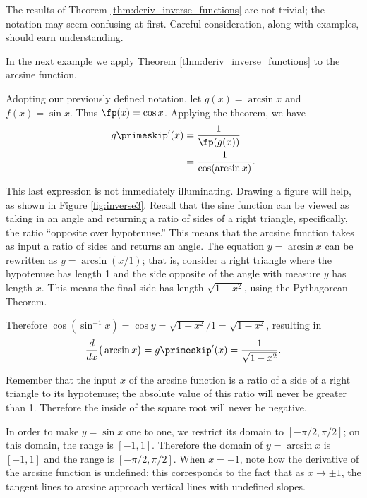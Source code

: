 The results of Theorem \ref{thm:deriv_inverse_functions} are not trivial; the notation may seem confusing at first. Careful consideration, along with examples, should earn understanding.

In the next example we apply Theorem \ref{thm:deriv_inverse_functions} to the arcsine function.\\

{Adopting our previously defined notation, let $g(x) = \arcsin x$ and $f(x) = \sin x$. Thus $\fp(x) = \cos x$. Applying the theorem, we have 
			\begin{align*}
			g\primeskip'(x) &= \frac{1}{\fp(g(x))} \\
						&= \frac{1}{\cos(\arcsin x)}.
			\end{align*}
			
This last expression is not immediately illuminating. Drawing a figure will help, as shown in Figure \ref{fig:inverse3}. Recall that the sine function can be viewed as taking in an angle and returning a ratio of sides of a right triangle, specifically, the ratio ``opposite over hypotenuse.'' This means that the arcsine function takes as input a ratio of sides and returns an angle. The equation $y=\arcsin x$ can be rewritten as $y=\arcsin (x/1)$; that is, consider a right triangle where the hypotenuse has length 1 and the side opposite of the angle with measure $y$ has length $x$. This means the final side has length $\sqrt{1-x^2}$, using the Pythagorean Theorem.

\bigskip
{}

Therefore $\cos (\sin^{-1} x) = \cos y = \sqrt{1-x^2}/1 = \sqrt{1-x^2}$, resulting in $$\frac{d}{dx}\big(\arcsin x\big) = g\primeskip'(x) = \frac{1}{\sqrt{1-x^2}}.$$}

Remember that the input $x$ of the arcsine function is a ratio of a side of a right triangle to its hypotenuse; the absolute value of this ratio will never be greater than 1. Therefore the inside of the square root will never be negative.

In order to make $y=\sin x$ one to one, we restrict its domain to $[-\pi/2,\pi/2]$; on this domain, the range is $[-1,1]$. Therefore the domain of $y=\arcsin x$ is $[-1,1]$ and the range is $[-\pi/2,\pi/2]$. When $x=\pm 1$, note how the derivative of the arcsine function is undefined; this corresponds to the fact that as $x\to \pm1$, the tangent lines to arcsine approach vertical lines with undefined slopes.


